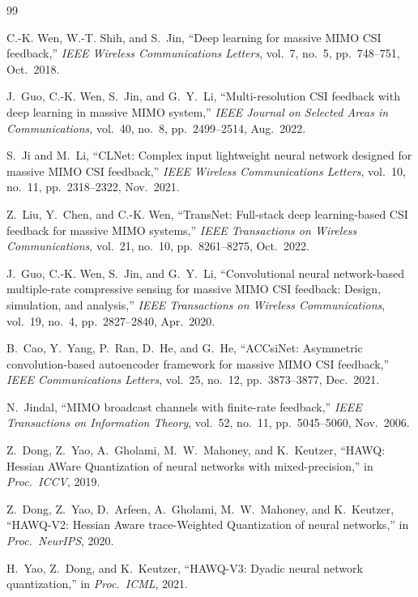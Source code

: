 \documentclass[conference]{IEEEtran}
\begin{document}
\begin{thebibliography}{99}

C.-K. Wen, W.-T. Shih, and S.~Jin,
``Deep learning for massive MIMO CSI feedback,''
\emph{IEEE Wireless Communications Letters}, vol.~7, no.~5, pp.~748--751, Oct.~2018.

J.~Guo, C.-K. Wen, S.~Jin, and G.~Y.~Li,
``Multi-resolution CSI feedback with deep learning in massive MIMO system,''
\emph{IEEE Journal on Selected Areas in Communications}, vol.~40, no.~8, pp.~2499--2514, Aug.~2022.

S.~Ji and M.~Li,
``CLNet: Complex input lightweight neural network designed for massive MIMO CSI feedback,''
\emph{IEEE Wireless Communications Letters}, vol.~10, no.~11, pp.~2318--2322, Nov.~2021.

Z.~Liu, Y.~Chen, and C.-K. Wen,
``TransNet: Full-stack deep learning-based CSI feedback for massive MIMO systems,''
\emph{IEEE Transactions on Wireless Communications}, vol.~21, no.~10, pp.~8261--8275, Oct.~2022.

J.~Guo, C.-K. Wen, S.~Jin, and G.~Y.~Li,
``Convolutional neural network-based multiple-rate compressive sensing for massive MIMO CSI feedback: Design, simulation, and analysis,''
\emph{IEEE Transactions on Wireless Communications}, vol.~19, no.~4, pp.~2827--2840, Apr.~2020.

B.~Cao, Y.~Yang, P.~Ran, D.~He, and G.~He,
``ACCsiNet: Asymmetric convolution-based autoencoder framework for massive MIMO CSI feedback,''
\emph{IEEE Communications Letters}, vol.~25, no.~12, pp.~3873--3877, Dec.~2021.

N.~Jindal,
``MIMO broadcast channels with finite-rate feedback,''
\emph{IEEE Transactions on Information Theory}, vol.~52, no.~11, pp.~5045--5060, Nov.~2006.

Z.~Dong, Z.~Yao, A.~Gholami, M.~W.~Mahoney, and K.~Keutzer,
``HAWQ: Hessian AWare Quantization of neural networks with mixed-precision,''
in \emph{Proc.\ ICCV}, 2019.

Z.~Dong, Z.~Yao, D.~Arfeen, A.~Gholami, M.~W.~Mahoney, and K.~Keutzer,
``HAWQ-V2: Hessian Aware trace-Weighted Quantization of neural networks,''
in \emph{Proc.\ NeurIPS}, 2020.

H.~Yao, Z.~Dong, and K.~Keutzer,
``HAWQ-V3: Dyadic neural network quantization,''
in \emph{Proc.\ ICML}, 2021.


\end{thebibliography}
\end{document}
